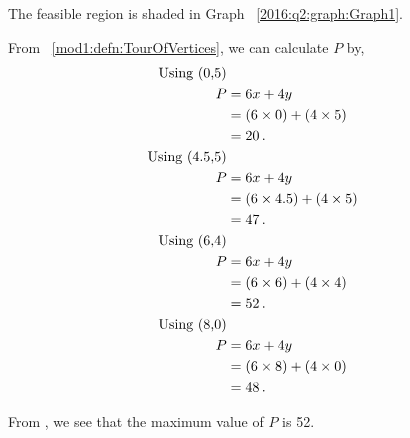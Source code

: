 \begin{subquestions}
\begin{subsubquestions}
The feasible region is shaded in Graph ~\ref{2016:q2:graph:Graph1}.


\subsubquestion

From ~\ref{mod1:defn:TourOfVertices}, we can calculate $P$ by,
\begin{align}
	\text{Using (0,5)}  \nonumber \\
	P & = 6x + 4y  \nonumber \\
      & = (6 \times 0) + (4 \times 5) \nonumber \\
	  & = 20 \,. \\
	\text{Using (4.5,5)}  \nonumber \\
	P & = 6x + 4y  \nonumber \\
	  & = (6 \times 4.5) + (4 \times 5)  \nonumber \\
	  & = 47 \,.    \\		  
	\text{Using (6,4)}  \nonumber \\
	P & = 6x + 4y \nonumber \\
	  & = (6 \times 6) + (4 \times 4)  \nonumber \\
	  & = 52 \,. \label{2016:q2:eqn:Profit} \\
	\text{Using (8,0)} \nonumber \\
	P & = 6x + 4y  \nonumber \\
	  & = (6 \times 8) + (4 \times 0)  \nonumber \\
	  & = 48 \,. 
\end{align}

From , we see that the maximum value of $P$ is 52.

\end{subsubquestions}


\subquestion

\begin{subsubquestions}
	
\subsubquestion


\end{subsubquestions}
\end{subquestions}
